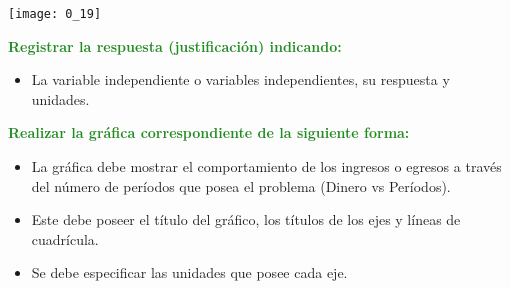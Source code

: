 \begin{enumerate}
\begin{enumerate}
        \begin{center}
        \texttt{[image: 0\_19]}
        \end{center}
    \end{enumerate}
    
    \textcolor{ForestGreen}{\item \textbf{Registrar la respuesta (justificación) indicando:}}
    \begin{itemize}
        \color{ForestGreen}
        \item La variable independiente o variables independientes, su respuesta y unidades.
    \end{itemize}

    \textcolor{ForestGreen}{\item \textbf{Realizar la gráfica correspondiente de la siguiente forma:}}
    \begin{itemize}
        \color{ForestGreen}
        \item La gráfica debe mostrar el comportamiento de los ingresos o egresos a través del número de períodos que posea el problema (Dinero vs Períodos).
        \item Este debe poseer el título del gráfico, los títulos de los ejes y líneas de cuadrícula. 
        \item Se debe especificar las unidades que posee cada eje.
    \end{itemize}


\end{enumerate}


